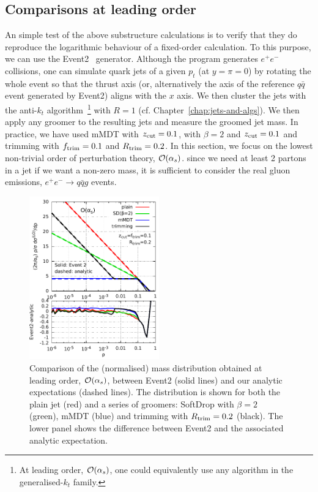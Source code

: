 \subsection{Comparisons at leading order}\label{sec:calc-groomed-mass-mc-lo}

An simple test of the above substructure calculations is to verify
that they do reproduce the logarithmic behaviour of a
fixed-order calculation.
%
To this purpose, we can use the
Event2~\cite{Catani:1996jh,Catani:1996vz} generator.
 Although the program generates $e^+e^-$ collisions,
one can simulate quark jets of a given $p_t$ (at $y=\pi=0$) by
rotating the whole event so that the thrust axis (or, alternatively
the axis of the reference $q\bar q$ event generated by Event2) aligns
with the $x$ axis.
%
We then cluster the jets with the anti-$k_t$
algorithm~\cite{Cacciari:2008gp}\footnote{At leading order,
  ${\cal {O}}(\alpha_s)$, one could equivalently use any algorithm in
  the generalised-$k_t$ family.} with $R=1$ (cf.
Chapter~\ref{chap:jets-and-algs}).
%
We then apply any groomer to the resulting jets and measure the
groomed jet mass.
%
In practice, we have used mMDT with $z_{\text{cut}}=0.1$, \SD with
$\beta=2$ and $z_{\text{cut}}=0.1$ and trimming with $f_{\text{trim}}=0.1$ and
$R_{\text{trim}}=0.2$.
%
In this section, we focus on the lowest non-trivial order of
perturbation theory, ${\cal{O}}(\alpha_s)$. since we need at least 2
partons in a jet if we want a non-zero mass, it is sufficient to
consider the real gluon emissions, \ie $e^+e^-\to q\bar
q g$ events.


\begin{figure}[t!]
  \includegraphics[width=0.5\textwidth]{figures/groomed-rho-event2.pdf}\hfill%
  \begin{minipage}[b]{0.42\textwidth}
    \caption{Comparison of the (normalised) mass distribution obtained
    at leading order, ${\cal{O}}(\alpha_s)$, between Event2 (solid
    lines) and our analytic expectations (dashed lines). The
    distribution is shown for both the plain jet (red) and a series of
    groomers: SoftDrop with $\beta=2$ (green), mMDT (blue) and
    trimming with $R_{\text{trim}}=0.2$ (black).
    The lower panel shows the difference between Event2 and the
    associated analytic expectation.
  }\label{fig:groomers-event2}
    \vspace*{1.4cm}
  \end{minipage}\hspace*{0.3cm}
\end{figure}

